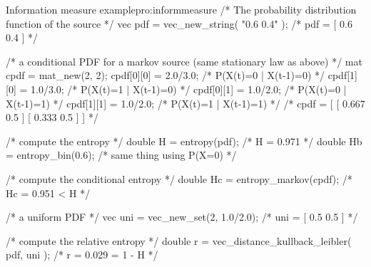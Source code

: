 \begin{program}{Information measure example}{pro:informmeasure}
/* The probability distribution function of the source        */
vec pdf = vec_new_string( "0.6 0.4" );           /* pdf = [ 0.6 0.4 ]        */

/* a conditional PDF for a markov source (same stationary law as above)      */
mat cpdf = mat_new(2, 2);
cpdf[0][0] = 2.0/3.0; /* P(X(t)=0 | X(t-1)=0) */
cpdf[1][0] = 1.0/3.0; /* P(X(t)=1 | X(t-1)=0) */
cpdf[0][1] = 1.0/2.0; /* P(X(t)=0 | X(t-1)=1) */
cpdf[1][1] = 1.0/2.0; /* P(X(t)=1 | X(t-1)=1) */
                                                 /* cpdf = [ [ 0.667 0.5 ]
                                                             [ 0.333 0.5 ] ] */

/* compute the entropy */   
double H  = entropy(pdf);                        /* H = 0.971 */
double Hb = entropy_bin(0.6);                    /* same thing using P(X=0)  */

/* compute the conditional entropy */
double Hc = entropy_markov(cpdf);                /* Hc = 0.951 < H */


/* a uniform PDF */
vec uni = vec_new_set(2, 1.0/2.0);               /* uni = [ 0.5 0.5 ]        */

/* compute the relative entropy */
double r = vec_distance_kullback_leibler( pdf, uni );   /* r = 0.029 = 1 - H */
\end{program}





